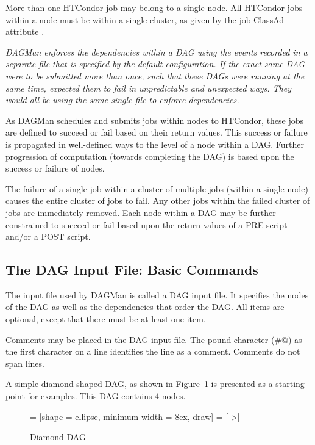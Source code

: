 More than one HTCondor job may belong to a single node.
All HTCondor jobs within a node must be within
a single cluster, as given by the job ClassAd attribute .

\emph{DAGMan enforces the dependencies within a DAG
using the events recorded in a separate
file that is specified by the default configuration.
If the exact same DAG were to be submitted more than once,
such that these DAGs were running at the same time,
expected them to fail in unpredictable and unexpected ways.
They would all be using the same single file to enforce dependencies. }

As DAGMan schedules and submits jobs within nodes to HTCondor,
these jobs are defined to succeed or fail based on their
return values.
This success or failure is propagated in well-defined ways to the level of
a node within a DAG.
Further progression of computation
(towards completing the DAG)
is based upon the success or failure of nodes.

The failure of a single job within a cluster
of multiple jobs
(within a single node)
causes the entire cluster of jobs to fail.
Any other jobs within the failed cluster of jobs are
immediately removed.
Each node within a DAG may be further constrained  to succeed or fail
based upon the return values of a PRE script and/or a POST script.

\subsection{The DAG Input File: Basic Commands}

The input file used by DAGMan is called a DAG input file.
It specifies the nodes of the DAG as well as the dependencies
that order the DAG.
All items are optional, except that there must be at least one 
item.

Comments may be placed in the DAG input file.
The pound character (\verb@#@) as the first character on a
line identifies the line as a comment.
Comments do not span lines.

A simple diamond-shaped DAG, as shown in
Figure~\ref{fig:dagman-diamond}
is presented as a starting point for examples.
This DAG contains 4 nodes.

\begin{figure}[hbt]
\centering
\usetikzlibrary{shapes}
 = [shape = ellipse, minimum width = 8ex, draw]
 = [->]

\caption{\label{fig:dagman-diamond}Diamond DAG}
\end{figure}


